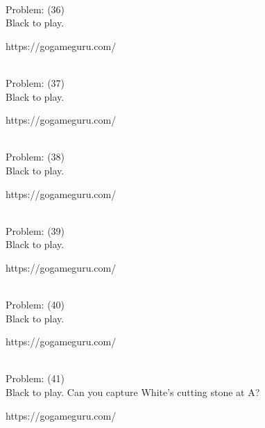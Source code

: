 \documentclass[11pt]{article}
\begin{document}
\begin{minipage}[t]{0.5\textwidth}
  {\centering
  
\\
Problem: (36)\\
Black to play.

https://gogameguru.com/\\
  }
\end{minipage}
\begin{minipage}[t]{0.5\textwidth}
  {\centering
  
\\
Problem: (37)\\
Black to play.

https://gogameguru.com/\\
  }
\end{minipage}
\begin{minipage}[t]{0.5\textwidth}
  {\centering
  
\\
Problem: (38)\\
Black to play.

https://gogameguru.com/\\
  }
\end{minipage}
\begin{minipage}[t]{0.5\textwidth}
  {\centering
  
\\
Problem: (39)\\
Black to play.

https://gogameguru.com/\\
  }
\end{minipage}
\begin{minipage}[t]{0.5\textwidth}
  {\centering
  
\\
Problem: (40)\\
Black to play.

https://gogameguru.com/\\
  }
\end{minipage}
\begin{minipage}[t]{0.5\textwidth}
  {\centering
  
\\
Problem: (41)\\
Black to play. Can you capture White's cutting stone at A?

https://gogameguru.com/\\
  }
\end{minipage}
\end{document}
